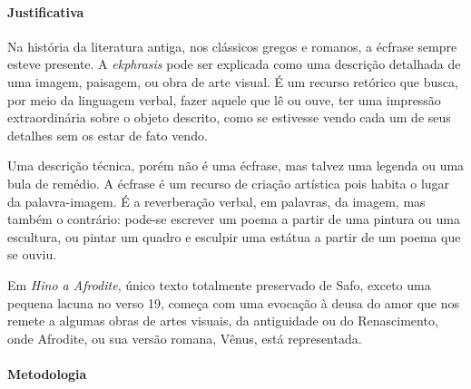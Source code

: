 \documentclass[12pt]{extarticle}
\begin{document}
\paragraph{Justificativa} Na história da literatura antiga, nos clássicos gregos
e romanos, a écfrase sempre esteve presente. A \textit{ekphrasis} pode ser 
explicada como uma descrição detalhada de uma imagem, paisagem, ou obra de 
arte visual. É um recurso retórico que busca, por meio da linguagem verbal, 
fazer aquele que lê ou ouve, ter uma impressão extraordinária sobre o objeto 
descrito, como se estivesse vendo cada um de seus detalhes sem os estar de fato vendo.

Uma descrição técnica, porém não é uma écfrase, mas talvez uma legenda ou uma
bula de remédio. A écfrase é um recurso de criação artística pois habita o lugar 
da palavra-imagem. É a reverberação verbal, em palavras, da imagem, mas também 
o contrário: pode-se escrever um poema a partir de uma pintura ou uma escultura, 
ou pintar um quadro e esculpir uma estátua a partir de um poema que se ouviu. 

Em \textit{Hino a Afrodite}, único texto totalmente preservado de Safo, exceto 
uma pequena lacuna no verso 19, começa com uma evocação à deusa do amor que
nos remete a algumas obras de artes visuais, da antiguidade ou do Renascimento,
onde Afrodite, ou sua versão romana, Vênus, está representada. 

\paragraph{Metodologia} 
\end{document}

